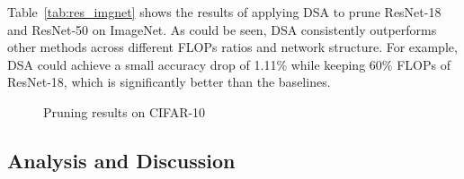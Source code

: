\documentclass[runningheads]{llncs}
\newcommand{\dsa}{DSA\xspace}
\begin{document}
  
  
  Table~\ref{tab:res_imgnet} shows the results of applying DSA to prune ResNet-18 and ResNet-50 on ImageNet. 
  As could be seen, DSA consistently outperforms other methods across different FLOPs ratios and network structure. For example, \dsa could achieve a small accuracy drop of 1.11\% while keeping 60\% FLOPs of ResNet-18, which is significantly better than the baselines. 
  
  
  
  \begin{figure}[ht]
    \centering
  \caption{Pruning results on CIFAR-10}
  \label{fig:results_cifar10}
  \end{figure}
  
  \subsection{Analysis and Discussion}
  \label{sec:analysis}
  
\end{document}
